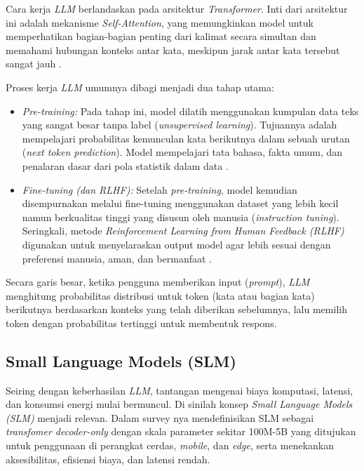 Cara kerja \textit{LLM} berlandaskan pada arsitektur \textit{Transformer}. Inti dari arsitektur ini adalah mekanisme \textit{Self-Attention}, yang memungkinkan model untuk memperhatikan bagian-bagian penting dari kalimat secara simultan dan memahami hubungan konteks antar kata, meskipun jarak antar kata tersebut sangat jauh \citep{vaswani2023attentionneed}.

Proses kerja \textit{LLM} umumnya dibagi menjadi dua tahap utama:

\begin{itemize}
    \item \textit{Pre-training:} Pada tahap ini, model dilatih menggunakan kumpulan data teks yang sangat besar tanpa label (\textit{unsupervised learning}). Tujuannya adalah mempelajari probabilitas kemunculan kata berikutnya dalam sebuah urutan (\textit{next token prediction}). Model mempelajari tata bahasa, fakta umum, dan penalaran dasar dari pola statistik dalam data \citep{brown2020languagemodelsfewshotlearners}.
    \item \textit{Fine-tuning (dan RLHF):} Setelah \textit{pre-training}, model kemudian disempurnakan melalui fine-tuning menggunakan dataset yang lebih kecil namun berkualitas tinggi yang disusun oleh manusia (\textit{instruction tuning}). Seringkali, metode \textit{Reinforcement Learning from Human Feedback (RLHF)} digunakan untuk menyelaraskan output model agar lebih sesuai dengan preferensi manusia, aman, dan bermanfaat \citep{ouyang2022traininglanguagemodelsfollow}.
\end{itemize}

Secara garis besar, ketika pengguna memberikan input (\textit{prompt}), \textit{LLM} menghitung probabilitas distribusi untuk token (kata atau bagian kata) berikutnya berdasarkan konteks yang telah diberikan sebelumnya, lalu memilih token dengan probabilitas tertinggi untuk membentuk respons.

\subsection{Small Language Models (SLM)}
Seiring dengan keberhasilan \textit{LLM}, tantangan mengenai biaya komputasi, latensi, dan konsumsi energi mulai bermuncul. Di sinilah konsep \textit{Small Language Models (SLM)} menjadi relevan. Dalam survey nya \cite{lu2025slm} mendefinisikan SLM sebagai \textit{transfomer decoder-only} dengan skala parameter sekitar 100M-5B yang ditujukan untuk penggunaan di perangkat cerdas, \textit{mobile}, dan \textit{edge}, serta menekankan aksesibilitas, efisiensi biaya, dan latensi rendah. 

